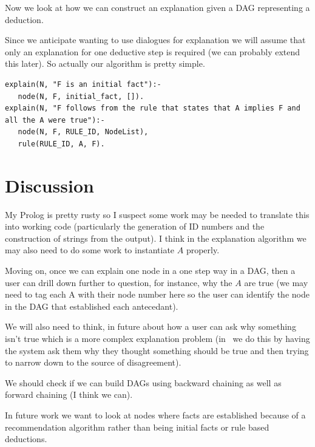 \documentclass{blue-book}
\begin{document}
Now we look at how we can construct an explanation given a DAG representing a deduction.

Since we anticipate wanting to use dialogues for explanation we will assume that only an explanation for one deductive step is required (we can probably extend this later).  So actually our algorithm is pretty simple.


\begin{verbatim}
explain(N, "F is an initial fact"):-
   node(N, F, initial_fact, []).
explain(N, "F follows from the rule that states that A implies F and all the A were true"):-
   node(N, F, RULE_ID, NodeList),
   rule(RULE_ID, A, F).
\end{verbatim}

\section{Discussion}
My Prolog is pretty rusty so I suspect some work may be needed to translate this into working code (particularly the generation of ID numbers and the construction of strings from the output).  I think in the explanation algorithm we may also need to do some work to instantiate $A$ properly.

Moving on, once we can explain one node in a one step way in a DAG, then a user can drill down further to question, for instance, why the $A$ are true (we may need to tag each A with their node number here so the user can identify the node in the DAG that established each antecedant).

We will also need to think, in future about how a user can ask why something isn't true which is a more complex explanation problem (in~\cite{DennisAAMAS21} we do this by having the system ask them why they thought  something should be true and then trying to narrow down to the source of disagreement).

We should check if we can build DAGs using backward chaining as well as forward chaining (I think we can).

In future work we want to look at nodes where facts are established because of a recommendation algorithm rather than being initial facts or rule based deductions.



\end{document}
